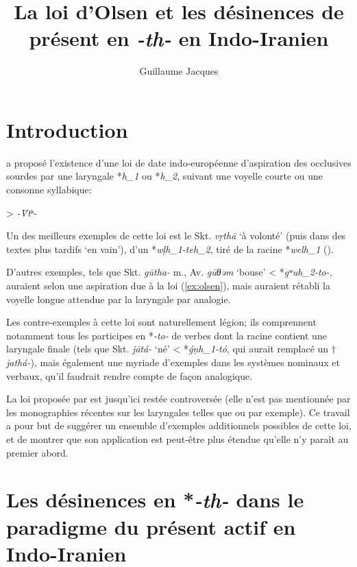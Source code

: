 \documentclass[oldfontcommands,oneside,a4paper,11pt]{article}
\newcommand{\ipa}[1]{{\phon\textit{#1}}} %
\newcommand{\refb}[1]{(\ref{#1})}
\begin{document}
 
\title{La loi d'Olsen et les désinences de présent en \ipa{-th-} en Indo-Iranien}
\author{Guillaume Jacques}
 \maketitle
 
 \section*{Introduction}
\citet{olsen94laryngeal} a proposé l'existence d'une loi de date indo-européenne d'aspiration des occlusives sourdes par une laryngale *\ipa{h_1} ou *\ipa{h_2}, suivant une voyelle courte ou une consonne syllabique:

\begin{exe}
\ex \label{ex:olsen}
\glt *\ipa{-V̆h_{1/2}T-} > \ipa{-V̆tʰ-}
\end{exe}

Un des meilleurs exemples de cette loi est le Skt. \ipa{vṛthā} `à volonté' (puis dans des textes plus tardifs `en vain'), d'un *\ipa{wḷh_1-teh_2}, tiré de la racine *\ipa{welh_1} (\citealt[677-8]{liv}). 

D'autres exemples, tels que Skt. \ipa{gūtha-} m., Av. \ipa{gūθəm} `bouse' < *\ipa{gʷuh_2-to-}, auraient selon \citet{olsen94laryngeal}  une aspiration due à la loi \refb{ex:olsen}, mais auraient rétabli la voyelle longue attendue par la laryngale par analogie.

Les contre-exemples à cette loi sont naturellement légion; ils comprennent notamment tous les participes en *\ipa{-to-} de verbes dont la racine contient une laryngale finale (tels que Skt. \ipa{jātá-} `né'  < *\ipa{ǵṇh_1-tó}, qui  aurait remplacé un $\dagger$\ipa{jathá-}), mais également une myriade d'exemples dans les systèmes nominaux et verbaux, qu'il faudrait rendre compte de façon analogique.

La loi proposée par \citet{olsen94laryngeal} est jusqu'ici restée controversée (elle n'est pas mentionnée par les monographies récentes sur les laryngales telles que \citealt{mayrhofer05fortsetzung} ou \citealt{zair12celtic} par exemple). Ce travail a pour but de suggérer un ensemble d'exemples additionnels possibles de cette loi, et de montrer que son application est peut-être plus étendue qu'elle n'y paraît au premier abord.

 \section{Les désinences en *\ipa{-th-} dans le paradigme du présent actif en Indo-Iranien}
\end{document}
